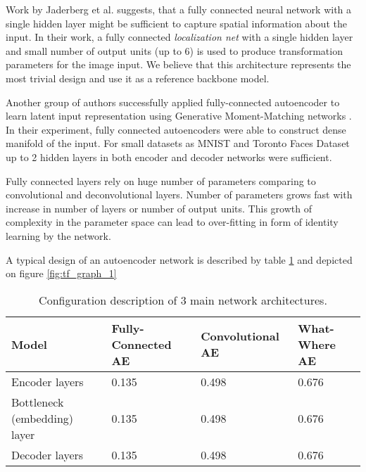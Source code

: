Work by Jaderberg et al. \cite{Jaderberg2015} suggests, that a fully connected neural network with a single hidden layer might be sufficient to capture spatial information about the input.
In their work, a fully connected \textit{localization net} with a single hidden layer and small number of output units (up to 6) is used to produce transformation parameters for the image input.
We believe that this architecture represents the most trivial design and use it as a reference backbone model.

Another group of authors successfully applied fully-connected autoencoder to learn latent input representation using Generative Moment-Matching networks \cite{Li2015}.
In their experiment, fully connected autoencoders were able to construct dense manifold of the input.
For small datasets as MNIST and Toronto Faces Dataset \cite{tfd,lecun-mnisthandwrittendigit-2010} up to 2 hidden layers in both encoder and decoder networks were sufficient.

Fully connected layers rely on huge number of parameters comparing to convolutional and deconvolutional layers.
Number of parameters grows fast with increase in number of layers or number of output units.
This growth of complexity in the parameter space can lead to over-fitting in form of identity learning by the network.

A typical design of an autoencoder network is described by table \ref{tab:nets} and depicted on figure \ref{fig:tf_graph_1}

\begin{table}
\begin{center}
    \begin{tabular}{| p{28mm} | p{35mm} | p{35mm} | p{35mm} |}
      \hline
       Model & Fully-Connected AE & Convolutional AE & What-Where AE \\ \hline
     Encoder layers		& 0.135 & 0.498 & 0.676 \\ \hline
     Bottleneck \newline (embedding) \newline layer & 0.135 & 0.498 & 0.676 \\ \hline
     Decoder layers		& 0.135 & 0.498 & 0.676 \\ \hline
    \end{tabular}
\end{center}
  \caption{Configuration description of 3 main network architectures.}
  \label{tab:nets}
\end{table}


